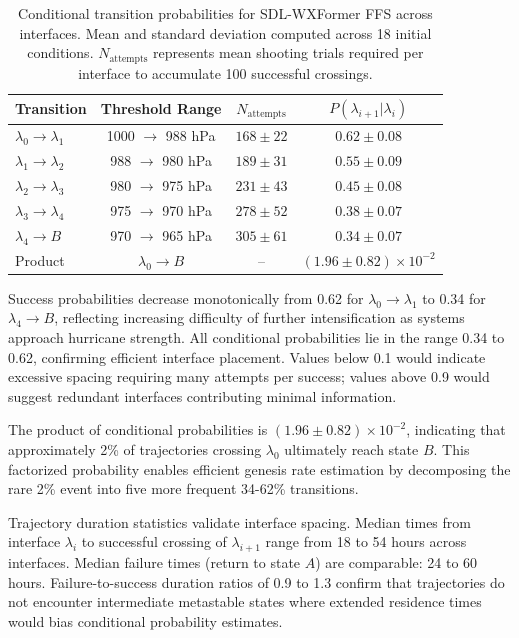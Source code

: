 \documentclass[11pt]{article}
\begin{document}
\begin{table}[htbp]
\centering
\caption{Conditional transition probabilities for SDL-WXFormer FFS across interfaces. Mean and standard deviation computed across 18 initial conditions. $N_{\text{attempts}}$ represents mean shooting trials required per interface to accumulate 100 successful crossings.}
\label{tab:shooting_results}
\begin{tabular}{lccc}
\toprule
Transition & Threshold Range & $N_{\text{attempts}}$ & $P(\lambda_{i+1}|\lambda_i)$ \\
\midrule
$\lambda_0 \to \lambda_1$ & 1000 $\to$ 988 hPa & $168 \pm 22$ & $0.62 \pm 0.08$ \\
$\lambda_1 \to \lambda_2$ & 988 $\to$ 980 hPa  & $189 \pm 31$ & $0.55 \pm 0.09$ \\
$\lambda_2 \to \lambda_3$ & 980 $\to$ 975 hPa  & $231 \pm 43$ & $0.45 \pm 0.08$ \\
$\lambda_3 \to \lambda_4$ & 975 $\to$ 970 hPa  & $278 \pm 52$ & $0.38 \pm 0.07$ \\
$\lambda_4 \to B$         & 970 $\to$ 965 hPa  & $305 \pm 61$ & $0.34 \pm 0.07$ \\
\midrule
Product & $\lambda_0 \to B$ & -- & $(1.96 \pm 0.82) \times 10^{-2}$ \\
\bottomrule
\end{tabular}
\end{table}

Success probabilities decrease monotonically from 0.62 for $\lambda_0 \to \lambda_1$ to 0.34 for $\lambda_4 \to B$, reflecting increasing difficulty of further intensification as systems approach hurricane strength. All conditional probabilities lie in the range 0.34 to 0.62, confirming efficient interface placement. Values below 0.1 would indicate excessive spacing requiring many attempts per success; values above 0.9 would suggest redundant interfaces contributing minimal information.

The product of conditional probabilities is $(1.96 \pm 0.82) \times 10^{-2}$, indicating that approximately 2\% of trajectories crossing $\lambda_0$ ultimately reach state $B$. This factorized probability enables efficient genesis rate estimation by decomposing the rare 2\% event into five more frequent 34-62\% transitions.

Trajectory duration statistics validate interface spacing. Median times from interface $\lambda_i$ to successful crossing of $\lambda_{i+1}$ range from 18 to 54 hours across interfaces. Median failure times (return to state $A$) are comparable: 24 to 60 hours. Failure-to-success duration ratios of 0.9 to 1.3 confirm that trajectories do not encounter intermediate metastable states where extended residence times would bias conditional probability estimates.
\end{document}
